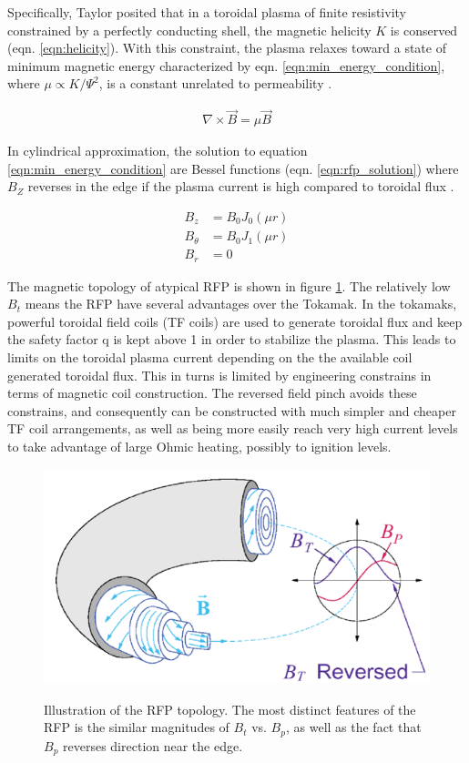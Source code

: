 \begin{refsection}
Specifically, Taylor posited that in a toroidal plasma of finite resistivity
constrained by a perfectly conducting shell, the magnetic helicity $K$ is
conserved (eqn. \ref{eqn:helicity}). With this constraint, the plasma relaxes
toward a state of minimum magnetic energy characterized by eqn.
\ref{eqn:min_energy_condition}, where $\mu \varpropto K/ \Psi ^2$, is a
constant unrelated to permeability . 

\begin{align}\label{eqn:min_energy_condition}
    \nabla \times \vec{B} = \mu \vec{B}
\end{align}

In cylindrical approximation, the solution to equation
\ref{eqn:min_energy_condition} are Bessel functions (eqn.
\ref{eqn:rfp_solution}) where $B_Z$ reverses in the edge if the plasma current
is high compared to toroidal flux \cite{Taylor74}.

\begin{align}\label{eqn:rfp_solution}
B_z &= B_0J_0(\mu r)\\
B_\theta &= B_0 J_1(\mu r)\\
B_r & = 0
\end{align}

The magnetic topology of atypical RFP is shown in figure
\ref{fig:RFP_geometry}. The relatively low $B_t$ means the RFP have several
advantages over the Tokamak. In the tokamaks, powerful toroidal field coils (TF
coils) are used to generate toroidal flux and keep the safety factor q is kept
above 1 in order to stabilize the plasma. This leads to limits on the toroidal
plasma current depending on the the available coil generated toroidal flux.
This in turns is limited by engineering constrains in terms of magnetic coil
construction. The reversed field pinch avoids these constrains, and
consequently can be constructed with much simpler and cheaper TF coil
arrangements, as well as being more easily reach very high current levels to
take advantage of large Ohmic heating, possibly to ignition levels.

\begin{figure}[!htb]
	\centering
	\includegraphics[width = 1.\linewidth]{./1_Introduction/RFP_mag_geometry.png}
	\label{fig:RFP_geometry}
	\caption[RFP magnetic topology]{Illustration of the RFP topology. The most distinct features of the RFP is the similar magnitudes of $B_t$ vs. $B_p$, as well as the fact that $B_p$ reverses direction near the edge.}
\end{figure}%


\end{refsection}

